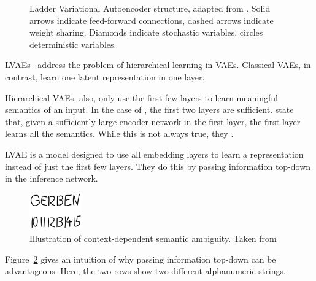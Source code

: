 \begin{figure}
    \caption[LVAE structure]{Ladder Variational Autoencoder structure, adapted from \citet{sonderby2016ladder}. Solid arrows indicate feed-forward connections, dashed arrows indicate weight sharing. Diamonds indicate stochastic variables, circles deterministic variables.}
    \label{fig:lvae}
\end{figure}

\aclp{LVAE}~\citep{sonderby2016ladder} address the problem of hierarchical learning in \acp{VAE}.
Classical \acp{VAE}, in contrast, learn one latent representation in one layer.

Hierarchical \acp{VAE}, also, only use the first few layers to learn meaningful semantics of an input.
In the case of \citet{sonderby2016ladder}, the first two layers are sufficient.
\citet{zhao2017learning} state that, given a sufficiently large encoder network in the first layer, the first layer learns all the semantics.
While this is not always true, they .

\ac{LVAE} is a model designed to use all embedding layers to learn a representation instead of just the first few layers.
They do this by passing information top-down in the inference network.
\begin{figure}
    \centering
    \includegraphics[width=0.2\textwidth]{images/gerben.png}
    \caption[Context-Dependent Semantic Ambiguity]{Illustration of context-dependent semantic ambiguity. Taken from \citet[p. 61]{van2016auto}}
    \label{fig:gerben_ambiguity}
\end{figure}
Figure~\ref{fig:gerben_ambiguity} gives an intuition of why passing information top-down can be advantageous.
Here, the two rows show two different alphanumeric strings.

